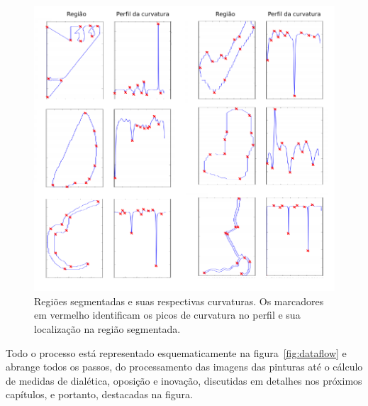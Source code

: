\begin{figure}[h!]
\begin{center}
            \caption{Regiões segmentadas e suas respectivas curvaturas. Os
        marcadores em vermelho identificam os picos de curvatura no
        perfil e sua localização na região segmentada.}
        \label{fig:passos_curvatura}
        \includegraphics[scale=1]{figs/passos_curvatura}
        \fonteminha
\end{center}
\end{figure}

Todo o processo está representado esquematicamente na figura~\ref{fig:dataflow}
e abrange todos os passos, do processamento das imagens das pinturas até o
cálculo de medidas de dialética, oposição e inovação, discutidas em detalhes nos
próximos capítulos, e portanto, destacadas na figura.

